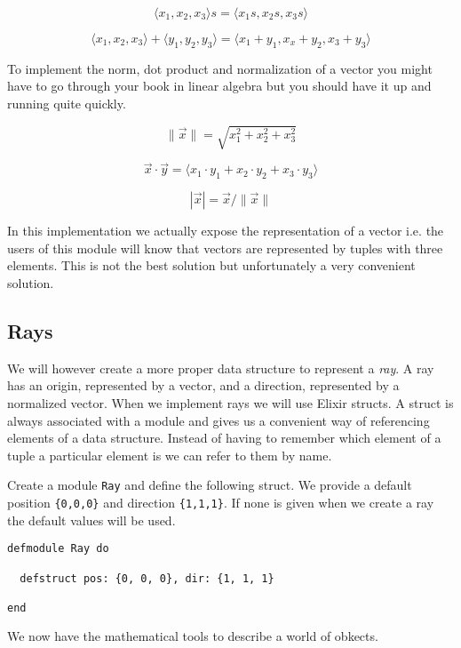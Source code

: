 \documentclass[a4paper,11pt]{article}
\begin{document}
$$\langle x_1, x_2, x_3 \rangle  s =  \langle x_1s, x_2s, x_3s \rangle$$

$$\langle x_1, x_2, x_3 \rangle + \langle y_1, y_2, y_3\rangle = \langle x_1+y_1, x_x+y_2, x_3+y_3 \rangle$$

To implement the norm, dot product and normalization of a vector you
might have to go through your book in linear algebra but you should
have it up and running quite quickly.

$$\|\vec{x}\| = \sqrt{x_1^2 + x_2^2 + x_3^2}$$

$$ \vec{x} \cdot \vec{y} = \langle x_1\cdot y_1 + x_2\cdot y_2 + x_3\cdot y_3\rangle $$ 

$$ |\vec{x}| = \vec{x}/\|\vec{x}\|$$

In this implementation we actually expose the representation of a
vector i.e. the users of this module will know that vectors are
represented by tuples with three elements. This is not the best
solution but unfortunately a very convenient solution.

\subsection*{Rays}

We will however create a more proper data structure to represent a {\em ray}. 
A ray has an origin, represented by a vector, and a direction,
represented by a normalized vector. When we implement rays we will use
Elixir structs. A struct is always associated with a module and gives
us a convenient way of referencing elements of a data structure. Instead
of having to remember which element of a tuple a particular element
is we can refer to them by name. 

Create a module {\tt Ray} and define the following struct. We provide
a default position {\tt \{0,0,0\}} and direction {\tt \{1,1,1\}}. If
none is given when we create a ray the default values will be used.

\begin{verbatim}
defmodule Ray do

  defstruct pos: {0, 0, 0}, dir: {1, 1, 1}
  
end
\end{verbatim}

We now have the mathematical tools to describe a world of obkects.



\end{document}
